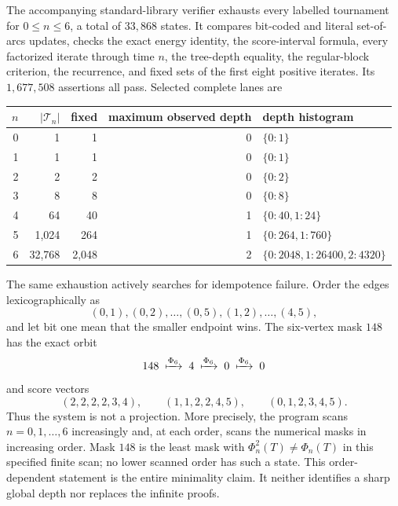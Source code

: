 \documentclass[11pt,a4paper]{amsart}
\theoremstyle{definition}
\theoremstyle{remark}
\newcommand{\Tourn}{\mathcal T}
\begin{document}
The accompanying standard-library verifier exhausts every labelled
tournament for $0\leq n\leq6$, a total of $33{,}868$ states.  It compares
bit-coded and literal set-of-arcs updates, checks the exact energy identity,
the score-interval formula, every factorized iterate through time $n$, the
tree-depth equality, the regular-block criterion, the recurrence, and fixed
sets of the first eight positive iterates.  Its $1{,}677{,}508$ assertions
all pass.  Selected complete lanes are
\begin{center}
\begin{tabular}{@{}rrrrl@{}}
\toprule
$n$ & $|\Tourn_n|$ & fixed & maximum observed depth & depth histogram\\
\midrule
0 & 1      & 1     & 0 & $\{0:1\}$\\
1 & 1      & 1     & 0 & $\{0:1\}$\\
2 & 2      & 2     & 0 & $\{0:2\}$\\
3 & 8      & 8     & 0 & $\{0:8\}$\\
4 & 64     & 40    & 1 & $\{0:40,1:24\}$\\
5 & 1,024  & 264   & 1 & $\{0:264,1:760\}$\\
6 & 32,768 & 2,048 & 2 & $\{0:2048,1:26400,2:4320\}$\\
\bottomrule
\end{tabular}
\end{center}

The same exhaustion actively searches for idempotence failure.  Order the
edges lexicographically as
\[
 (0,1),(0,2),\ldots,(0,5),(1,2),\ldots,(4,5),
\]
and let bit one mean that the smaller endpoint wins.  The six-vertex mask
$148$ has the exact orbit
\[
 148\;\xmapsto{\Phi_6}\;4\;\xmapsto{\Phi_6}\;0
 \;\xmapsto{\Phi_6}\;0
\]
and score vectors
\[
 (2,2,2,2,3,4),\qquad(1,1,2,2,4,5),\qquad(0,1,2,3,4,5).
\]
Thus the system is not a projection.  More precisely, the program scans
$n=0,1,\ldots,6$ increasingly and, at each order, scans the numerical masks
in increasing order.  Mask $148$ is the least mask with
$\Phi_n^2(T)\ne\Phi_n(T)$ in this specified finite scan; no lower scanned
order has such a state.  This order-dependent statement is the entire
minimality claim.  It neither identifies a sharp global depth nor replaces
the infinite proofs.
\end{document}
